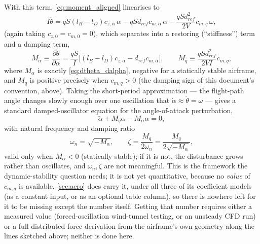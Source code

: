 With this term, \autoref{eq:moment_aligned} linearises to
\begin{equation}
    I\ddot\theta = qS(l_B-l_D)c_{z,\alpha}\,\alpha - qSd_{ref}c_{m,\alpha}\,\alpha
        - \frac{qSd_{ref}^2}{2V}c_{m,q}\,\omega,
\end{equation}
(again taking $c_{z,0}=c_{m,0}=0$), which separates into a restoring (``stiffness'') term and a
damping term,
\begin{equation}
    M_\alpha \equiv \frac{\partial\ddot\theta}{\partial\alpha}
        = \frac{qS}{I}\bigl[(l_B-l_D)c_{z,\alpha}-d_{ref}c_{m,\alpha}\bigr], \qquad
    M_q \equiv \frac{qSd_{ref}^2}{2VI}c_{m,q},
\end{equation}
where $M_\alpha$ is exactly \autoref{eq:dtheta_dalpha}, negative for a statically stable airframe,
and $M_q$ is positive precisely when $c_{m,q}>0$ (the damping sign of this document's convention,
above).
Taking the short-period approximation --- the flight-path angle changes slowly enough over one
oscillation that $\dot\alpha\approx\dot\theta=\omega$ --- gives a standard damped-oscillator
equation for the angle-of-attack perturbation,
\begin{equation}
    \ddot\alpha + M_q\dot\alpha - M_\alpha\alpha = 0,
\end{equation}
with natural frequency and damping ratio
\begin{equation}
    \omega_n = \sqrt{-M_\alpha}, \qquad \zeta = \frac{M_q}{2\omega_n} = \frac{M_q}{2\sqrt{-M_\alpha}},
\end{equation}
valid only when $M_\alpha<0$ (statically stable); if it is not, the disturbance grows rather than
oscillates, and $\omega_n,\zeta$ are not meaningful. This is the framework the dynamic-stability
question needs; it is not yet quantitative, because no \emph{value} of $c_{m,q}$ is available.
\autoref{sec:aero} does carry it, under all three of its coefficient models (as a constant input,
or as an optional table column), so there is nowhere left for it to be missing except the number
itself. Getting that number requires either a measured
value (forced-oscillation wind-tunnel testing, or an unsteady CFD run) or a full distributed-force
derivation from the airframe's own geometry along the lines sketched above; neither is done here.
